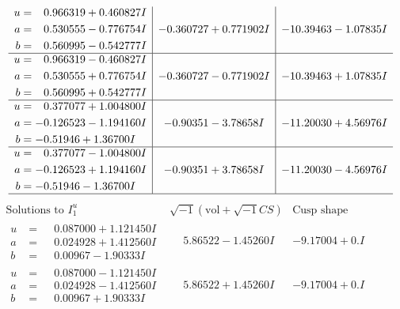 \documentclass[1p]{elsarticle_modified}
\theoremstyle{definition}
\newcommand{\I}{\sqrt{-1}}
\begin{document}
$$\begin{array}{c|c|c}
\begin{aligned}
u &= \phantom{-}0.966319 + 0.460827 I \\
a &= \phantom{-}0.530555 - 0.776754 I \\
b &= \phantom{-}0.560995 - 0.542777 I\end{aligned}
 & -0.360727 + 0.771902 I & -10.39463 - 1.07835 I \\ \hline\begin{aligned}
u &= \phantom{-}0.966319 - 0.460827 I \\
a &= \phantom{-}0.530555 + 0.776754 I \\
b &= \phantom{-}0.560995 + 0.542777 I\end{aligned}
 & -0.360727 - 0.771902 I & -10.39463 + 1.07835 I \\ \hline\begin{aligned}
u &= \phantom{-}0.377077 + 1.004800 I \\
a &= -0.126523 - 1.194160 I \\
b &= -0.51946 + 1.36700 I\end{aligned}
 & -0.90351 - 3.78658 I & -11.20030 + 4.56976 I \\ \hline\begin{aligned}
u &= \phantom{-}0.377077 - 1.004800 I \\
a &= -0.126523 + 1.194160 I \\
b &= -0.51946 - 1.36700 I\end{aligned}
 & -0.90351 + 3.78658 I & -11.20030 - 4.56976 I\\
 \hline 
 \end{array}$$\newpage$$\begin{array}{c|c|c}  
\text{Solutions to }I^u_{1}& \I (\text{vol} + \sqrt{-1}CS) & \text{Cusp shape}\\
 \hline 
\begin{aligned}
u &= \phantom{-}0.087000 + 1.121450 I \\
a &= \phantom{-}0.024928 + 1.412560 I \\
b &= \phantom{-}0.00967 - 1.90333 I\end{aligned}
 & \phantom{-}5.86522 - 1.45260 I & -9.17004 + 0. I\phantom{ +0.000000I} \\ \hline\begin{aligned}
u &= \phantom{-}0.087000 - 1.121450 I \\
a &= \phantom{-}0.024928 - 1.412560 I \\
b &= \phantom{-}0.00967 + 1.90333 I\end{aligned}
 & \phantom{-}5.86522 + 1.45260 I & -9.17004 + 0. I\phantom{ +0.000000I} \\ \hline\begin{aligned}

\end{aligned}
\end{array}$$
\end{document}
